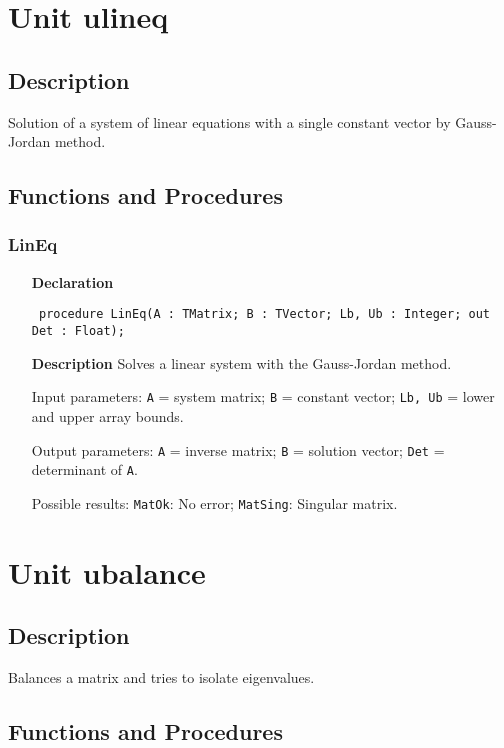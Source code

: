 \documentclass[12pt,a4paper,oneside]{report}
\newcommand{\declarationitem}[1]{\textbf{#1}}
\newcommand{\descriptiontitle}[1]{\textbf{#1}}
\newcommand{\code}[1]{\texttt{#1}}
\begin{document}
\section{Unit ulineq}
\label{ulineq}
\subsection{Description}
Solution of a system of linear equations with a single constant vector by Gauss{-}Jordan method. 
\subsection{Functions and Procedures}
\subsubsection{LinEq}
\label{ulineq-LinEq}
\begin{itemize}\item[\declarationitem{Declaration}\hfill]
	\begin{flushleft}
		\code{
			procedure LinEq(A : TMatrix; B : TVector; Lb, Ub : Integer; out Det : Float);}
		
	\end{flushleft}
	
	\par
	\item[\descriptiontitle{Description}]
	Solves a linear system with the Gauss{-}Jordan method.
	
	Input parameters: \code{A} = system matrix; \code{B} = constant vector; \code{Lb, Ub} = lower and upper array bounds.
	
	Output parameters: \code{A} = inverse matrix; \code{B} = solution vector; \code{Det} = determinant of \code{A}.
	
	Possible results: \code{MatOk}: No error; \code{MatSing}: Singular matrix.
	
\end{itemize}
\section{Unit ubalance}
\label{ubalance}
\subsection{Description}
Balances a matrix and tries to isolate eigenvalues. 
\subsection{Functions and Procedures}
\end{document}
